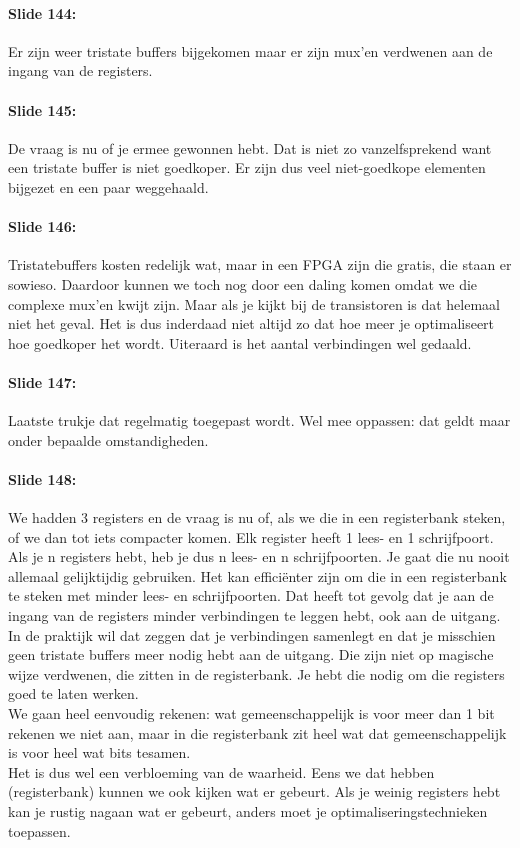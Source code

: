\documentclass[10pt,a4paper]{book}
\begin{document}
\paragraph{Slide 144:} Er zijn weer tristate buffers bijgekomen maar er zijn mux'en verdwenen aan de ingang van de registers. 

\paragraph{Slide 145:} De vraag is nu of je ermee gewonnen hebt. Dat is niet zo vanzelfsprekend want een tristate buffer is niet goedkoper. Er zijn dus veel niet-goedkope elementen bijgezet en een paar weggehaald. 

\paragraph{Slide 146:} Tristatebuffers kosten redelijk wat, maar in een FPGA zijn die gratis, die staan er sowieso. Daardoor kunnen we toch nog door een daling komen omdat we die complexe mux'en kwijt zijn. Maar als je kijkt bij de transistoren is dat helemaal niet het geval. Het is dus inderdaad niet altijd zo dat hoe meer je optimaliseert hoe goedkoper het wordt. Uiteraard is het aantal verbindingen wel gedaald.

\paragraph{Slide 147:} Laatste trukje dat regelmatig toegepast wordt. Wel mee oppassen: dat geldt maar onder bepaalde omstandigheden. 

\paragraph{Slide 148:} We hadden 3 registers en de vraag is nu of, als we die in een registerbank steken, of we dan tot iets compacter komen. Elk register heeft 1 lees- en 1 schrijfpoort. Als je n registers hebt, heb je dus n lees- en n schrijfpoorten. Je gaat die nu nooit allemaal gelijktijdig gebruiken. Het kan effici\"enter zijn om die in een registerbank te steken met minder lees- en schrijfpoorten. Dat heeft tot gevolg dat je aan de ingang van de registers minder verbindingen te leggen hebt, ook aan de uitgang. In de praktijk wil dat zeggen dat je verbindingen samenlegt en dat je misschien geen tristate buffers meer nodig hebt aan de uitgang. Die zijn niet op magische wijze verdwenen, die zitten in de registerbank. Je hebt die nodig om die registers goed te laten werken.\\
We gaan heel eenvoudig rekenen: wat gemeenschappelijk is voor meer dan 1 bit rekenen we niet aan, maar in die registerbank zit heel wat dat gemeenschappelijk is voor heel wat bits tesamen.\\
Het is dus wel een verbloeming van de waarheid. Eens we dat hebben (registerbank) kunnen we ook kijken wat er gebeurt. Als je weinig registers hebt kan je rustig nagaan wat er gebeurt, anders moet je optimaliseringstechnieken toepassen.
\end{document}
